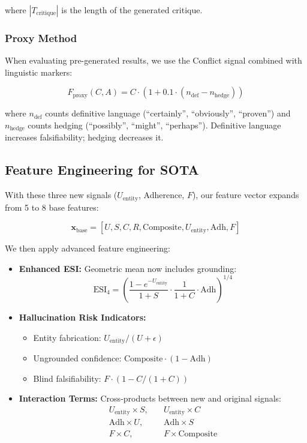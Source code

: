 where $|T_{\text{critique}}|$ is the length of the generated critique.

\subsubsection{Proxy Method}
When evaluating pre-generated results, we use the Conflict signal combined with linguistic markers:

\begin{equation}
    F_{\text{proxy}}(C, A) = C \cdot (1 + 0.1 \cdot (n_{\text{def}} - n_{\text{hedge}}))
\end{equation}

where $n_{\text{def}}$ counts definitive language (``certainly'', ``obviously'', ``proven'') and $n_{\text{hedge}}$ counts hedging (``possibly'', ``might'', ``perhaps''). Definitive language increases falsifiability; hedging decreases it.

\subsection{Feature Engineering for SOTA}

With these three new signals ($U_{\text{entity}}$, Adherence, $F$), our feature vector expands from 5 to 8 base features:

\begin{equation}
    \mathbf{x}_{\text{base}} = [U, S, C, R, \text{Composite}, U_{\text{entity}}, \text{Adh}, F]
\end{equation}

We then apply advanced feature engineering:

\begin{itemize}[leftmargin=*]
    \item \textbf{Enhanced ESI:} Geometric mean now includes grounding: 
    $$\text{ESI}_4 = \left(\frac{1-e^{-U_{\text{entity}}}}{1+S} \cdot \frac{1}{1+C} \cdot \text{Adh}\right)^{1/4}$$
    
    \item \textbf{Hallucination Risk Indicators:}
    \begin{itemize}
        \item Entity fabrication: $U_{\text{entity}} / (U + \epsilon)$
        \item Ungrounded confidence: $\text{Composite} \cdot (1 - \text{Adh})$
        \item Blind falsifiability: $F \cdot (1 - C/(1+C))$
    \end{itemize}
    
    \item \textbf{Interaction Terms:} Cross-products between new and original signals:
    \begin{align*}
        U_{\text{entity}} \times S, &\quad U_{\text{entity}} \times C \\
        \text{Adh} \times U, &\quad \text{Adh} \times S \\
        F \times C, &\quad F \times \text{Composite}
    \end{align*}
\end{itemize}

